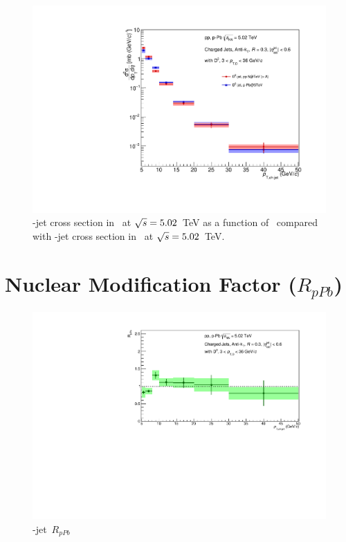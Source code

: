 \begin{figure}[bth]
\begin{center}
\includegraphics[width=.6\textwidth]{PF_approval/RpPb_pPbcuts}
\caption{\Dzero-jet cross section in \pp\ at $\sqrt{s}=5.02$~TeV as a function of \ptchjet\ compared with \Dzero-jet cross section in \pPb\ at $\sqrt{s}=5.02$~TeV.} 
\label{fig:PromptD0JetPtSpectrum_pp_pPb}
\end{center}
\end{figure}



\section{Nuclear Modification Factor ($R_{pPb}$)}

\begin{figure}[bth]
\centering
\includegraphics[width=.6\textwidth]{PF_approval/RpPb_pPbcuts_ratio}
\caption{\Dzero-jet\ $R_{pPb}$}
\label{fig:SysUnce_Dzero}
\end{figure}

